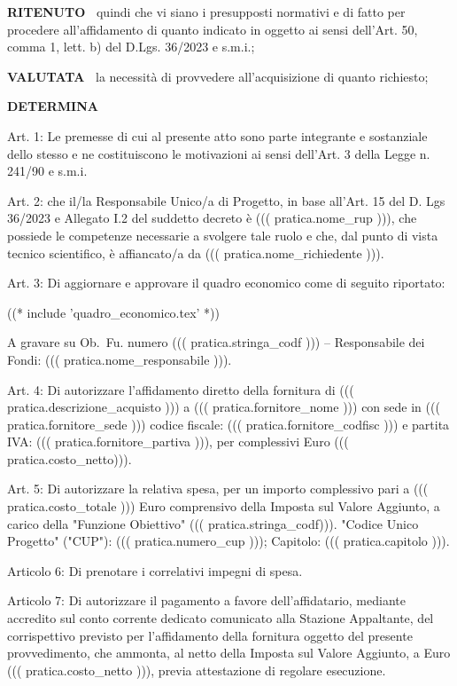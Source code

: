 \documentclass[a4paper,12pt]{letter}
\begin{document}
\textbf{RITENUTO~} quindi che vi siano i presupposti normativi e
di fatto per procedere all’affidamento di quanto indicato in oggetto
ai sensi dell’Art. 50, comma 1, lett. b) del D.Lgs. 36/2023 e s.m.i.;

\textbf{VALUTATA~} la necessità di provvedere all’acquisizione
di quanto richiesto;

\begin{center}
	\textbf{DETERMINA}
\end{center}

Art. 1: Le premesse di cui al presente atto sono parte integrante e
sostanziale dello stesso e ne costituiscono le motivazioni ai sensi
dell’Art. 3 della Legge n. 241/90 e s.m.i.

Art. 2: che il/la Responsabile Unico/a di Progetto, in base all’Art. 15 del
D. Lgs 36/2023 e Allegato I.2 del suddetto decreto è ((( pratica.nome_rup ))),
che possiede le competenze necessarie a svolgere tale ruolo
e che, dal punto di vista tecnico scientifico, è affiancato/a da
((( pratica.nome_richiedente ))).

Art. 3: Di aggiornare e approvare il quadro economico come di seguito riportato:

((* include 'quadro_economico.tex' *))

A gravare su Ob.~Fu. numero ((( pratica.stringa_codf ))) – Responsabile dei
Fondi: ((( pratica.nome_responsabile ))).

Art. 4: Di autorizzare l’affidamento diretto della fornitura di ((( pratica.descrizione_acquisto ))) a
((( pratica.fornitore_nome ))) con sede in  ((( pratica.fornitore_sede )))
codice fiscale: ((( pratica.fornitore_codfisc ))) e partita IVA:
((( pratica.fornitore_partiva ))), per complessivi Euro ((( pratica.costo_netto))).

Art. 5: Di autorizzare la relativa spesa, per un importo complessivo
pari a ((( pratica.costo_totale ))) Euro comprensivo della Imposta sul
Valore Aggiunto, a carico della "Funzione Obiettivo" ((( pratica.stringa_codf))).
"Codice Unico Progetto" ("CUP"): ((( pratica.numero_cup )));  Capitolo:
((( pratica.capitolo ))).

Articolo 6: Di prenotare i correlativi impegni di spesa.

Articolo 7: Di autorizzare il pagamento a favore dell’affidatario,
mediante accredito sul conto corrente dedicato comunicato alla Stazione
Appaltante, del corrispettivo previsto per l’affidamento della
fornitura oggetto del presente provvedimento, che ammonta, al netto
della Imposta sul Valore Aggiunto, a Euro ((( pratica.costo_netto ))),
previa attestazione di regolare esecuzione.
\end{document}
